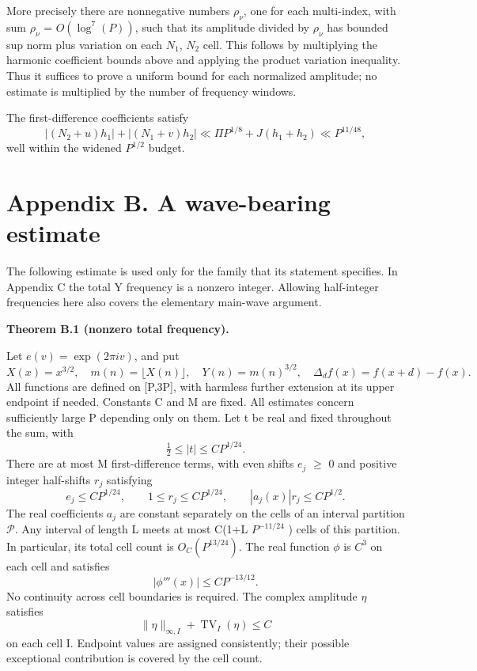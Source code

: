 \documentclass[11pt,a4paper]{article}
\begin{document}
More precisely there are nonnegative numbers \(\rho_\nu\), one for each
multi-index, with sum \(\rho_\nu\) = \(O(\log^7(P))\), such that its
amplitude divided by \(\rho_\nu\) has bounded sup norm plus variation on
each \(N_1\), \(N_2\) cell. This follows by multiplying the harmonic
coefficient bounds above and applying the product variation inequality.
Thus it suffices to prove a uniform bound for each normalized amplitude;
no estimate is multiplied by the number of frequency windows.

The first-difference coefficients satisfy \[
|(N_2+u)h_1|+|(N_1+v)h_2|
\ll \Pi P^{1/8}+J(h_1+h_2)\ll P^{11/48}, \tag{A.20}
\] well within the widened \(P^{1/2}\) budget.

\section{Appendix B. A wave-bearing
estimate}\label{appendix-b.-a-wave-bearing-estimate}

The following estimate is used only for the family that its statement
specifies. In Appendix C the total Y frequency is a nonzero integer.
Allowing half-integer frequencies here also covers the elementary
main-wave argument.


\textbf{Theorem B.1 (nonzero total frequency).}

Let \(e(v)=\exp(2\pi i v)\), and put \[
X(x)=x^{3/2},\quad m(n)=\lfloor X(n)\rfloor,\quad
Y(n)=m(n)^{3/2},\quad \Delta_d f(x)=f(x+d)-f(x).
\] All functions are defined on {[}P,3P{]}, with harmless further
extension at its upper endpoint if needed. Constants C and M are fixed.
All estimates concern sufficiently large P depending only on them. Let t
be real and fixed throughout the sum, with \[
\tfrac12\le |t|\le CP^{1/24}.
\] There are at most M first-difference terms, with even shifts \(e_j\)
\(\ge\) 0 and positive integer half-shifts \(r_j\) satisfying \[
e_j\le CP^{1/24},\qquad 1\le r_j\le CP^{1/24},
\qquad |a_j(x)|r_j\le CP^{1/2}. \tag{B.1}
\] The real coefficients \(a_j\) are constant separately on the cells of
an interval partition \(\mathcal P\). Any interval of length L meets at
most C(1+L \(P^{-11/24}\) ) cells of this partition. In particular, its
total cell count is \(O_C(P^{13/24})\). The real function \(\phi\) is
\(C^{3}\) on each cell and satisfies \[
|\phi'''(x)|\le CP^{-13/12}. \tag{B.2}
\] No continuity across cell boundaries is required. The complex
amplitude \(\eta\) satisfies \[
\|\eta\|_{\infty,I}+\operatorname{TV}_I(\eta)\le C
\] on each cell I. Endpoint values are assigned consistently; their
possible exceptional contribution is covered by the cell count.
\end{document}
